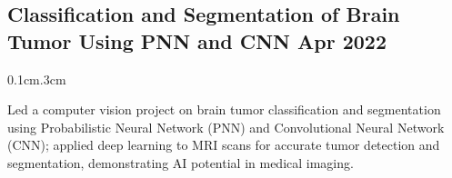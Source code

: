 \subsection{{ Classification and Segmentation of Brain Tumor Using PNN and CNN \hfill Apr 2022}}
\begin{adjustwidth}{0.1cm}{.3cm}
\begin{zitemize}
\item \begin{justify} Led a computer vision project on brain tumor classification and segmentation using Probabilistic Neural Network (PNN) and Convolutional Neural Network (CNN); applied deep learning to MRI scans for accurate tumor detection and segmentation, demonstrating AI potential in medical imaging.\end{justify}

\end{zitemize}
\end{adjustwidth}

\vspace{.10em}
